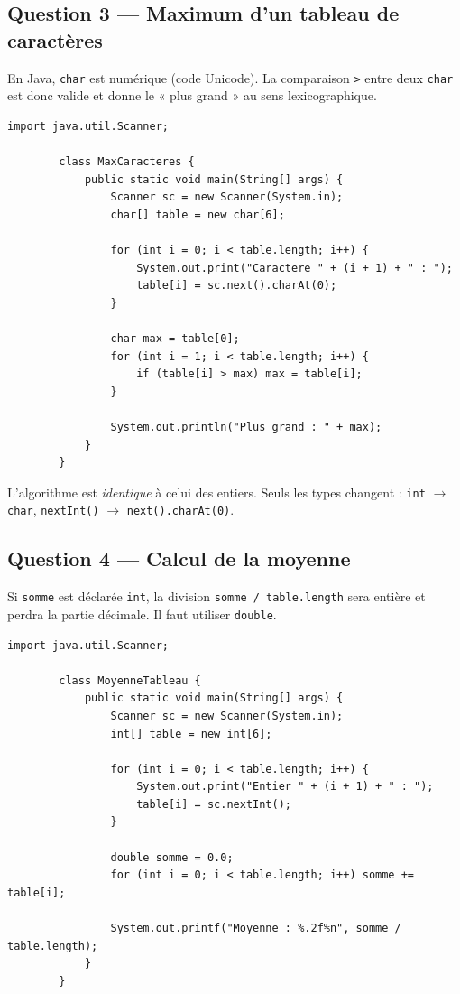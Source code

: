 \documentclass[12pt,a4paper]{article}
\begin{document}
	\subsection*{Question 3 — Maximum d'un tableau de caractères}
	
	\begin{boiteRaisonnement}
		En Java, \texttt{char} est numérique (code Unicode). La comparaison \texttt{>}
		entre deux \texttt{char} est donc valide et donne le « plus grand » au sens
		lexicographique.
	\end{boiteRaisonnement}
	
	\begin{lstlisting}[style=java, caption={Q3 — Plus grand caractère}]
		import java.util.Scanner;
		
		class MaxCaracteres {
			public static void main(String[] args) {
				Scanner sc = new Scanner(System.in);
				char[] table = new char[6];
				
				for (int i = 0; i < table.length; i++) {
					System.out.print("Caractere " + (i + 1) + " : ");
					table[i] = sc.next().charAt(0);
				}
				
				char max = table[0];
				for (int i = 1; i < table.length; i++) {
					if (table[i] > max) max = table[i];
				}
				
				System.out.println("Plus grand : " + max);
			}
		}
	\end{lstlisting}
	
	\begin{boiteResultat}
		L'algorithme est \emph{identique} à celui des entiers. Seuls les types changent :
		\texttt{int} $\rightarrow$ \texttt{char}, \texttt{nextInt()} $\rightarrow$
		\texttt{next().charAt(0)}.
	\end{boiteResultat}
	
	\subsection*{Question 4 — Calcul de la moyenne}
	
	\begin{boiteErreur}
		Si \texttt{somme} est déclarée \texttt{int}, la division \texttt{somme / table.length}
		sera entière et perdra la partie décimale. Il faut utiliser \texttt{double}.
	\end{boiteErreur}
	
	\begin{lstlisting}[style=java, caption={Q4 — Moyenne}]
		import java.util.Scanner;
		
		class MoyenneTableau {
			public static void main(String[] args) {
				Scanner sc = new Scanner(System.in);
				int[] table = new int[6];
				
				for (int i = 0; i < table.length; i++) {
					System.out.print("Entier " + (i + 1) + " : ");
					table[i] = sc.nextInt();
				}
				
				double somme = 0.0;
				for (int i = 0; i < table.length; i++) somme += table[i];
				
				System.out.printf("Moyenne : %.2f%n", somme / table.length);
			}
		}
	\end{lstlisting}
	
\end{document}
